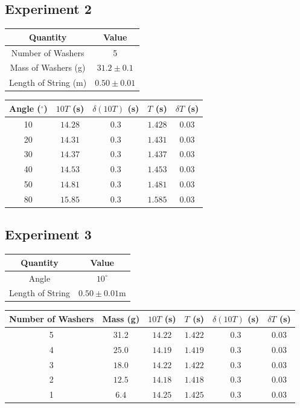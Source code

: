 \documentclass[10pt]{extarticle}
\begin{document}
{\subsection*{Experiment 2}%
  \begin{center}
    \renewcommand{\arraystretch}{1.5}
    \begin{tabular}{c|c}
      Quantity & Value\\
      \hline
      Number of Washers & 5\\
      Mass of Washers (g) & $31.2\pm 0.1$ \\
      Length of String (m) & $0.50\pm 0.01$
      \end{tabular}
      \begin{tabular}{c|c|c|c|c}
        Angle ($^{\circ}$) & $10T$ (s) & $\delta (10T)$ (s) & $T$ (s) & $\delta T$ (s) \\
        \hline
        10 & $14.28$ & $0.3$ & $1.428$ & $0.03$\\
        20 & $14.31$ & $0.3$ & $1.431$ & $0.03$ \\
        30 & $14.37$ & $0.3$ & $1.437$ & $0.03$\\
        40 & $14.53$ &  $0.3$ & $1.453$ & $0.03$\\
        50 & $14.81$ & $0.3$ & $1.481$ & $0.03$\\
        80 & $15.85$ & $0.3$ & $1.585$ & $0.03$
        \end{tabular}
    \end{center} 	
\subsection*{Experiment 3}%
  \begin{center}
    \renewcommand{\arraystretch}{1.5}
    \begin{tabular}{c|c}
      Quantity & Value\\
      \hline
      Angle & $10^{\circ}$\\
      Length of String & $0.50\pm 0.01$m
        
    \end{tabular}
    \begin{tabular}{c|c|c|c|c|c}
      Number of Washers & Mass (g) & $10T$ (s) & $T$ (s) & $\delta (10T)$ (s) & $\delta T $ (s)\\
      \hline
      5 & 31.2 & $14.22$ & $1.422$ & $0.3$ & $0.03$ \\
      4 & $25.0$ & $14.19$ & $1.419$ & $0.3$ & $0.03$ \\
      3 & $18.0$ & $14.22$ & $1.422$ & $0.3$ & $0.03$ \\
      2 & $12.5$ & $14.18$ & $1.418$ & $0.3$ & $0.03$ \\
      1 & $6.4$ & $14.25$ & $1.425$ & $0.3$ & $0.03$
      \end{tabular}
  \end{center}
}
\end{document}
